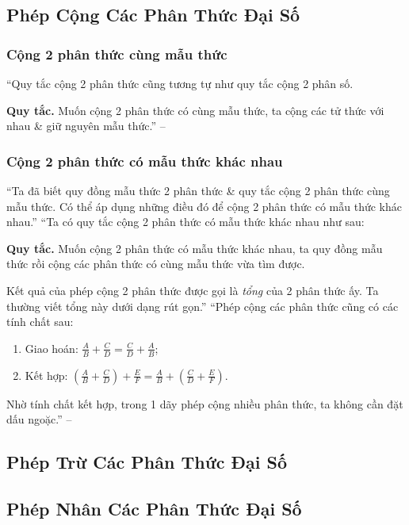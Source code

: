 \documentclass{article}
\numberwithin{equation}{section}
\begin{document}
\subsection{Phép Cộng Các Phân Thức Đại Số}

\subsubsection{Cộng 2 phân thức cùng mẫu thức}
``Quy tắc cộng 2 phân thức cũng tương tự như quy tắc cộng 2 phân số.

\textbf{Quy tắc.} Muốn cộng 2 phân thức có cùng mẫu thức, ta cộng các tử thức với nhau \& giữ nguyên mẫu thức.'' -- \cite[p. 44]{SGK_Toan_8_tap_1}

\subsubsection{Cộng 2 phân thức có mẫu thức khác nhau}
``Ta đã biết quy đồng mẫu thức 2 phân thức \& quy tắc cộng 2 phân thức cùng mẫu thức. Có thể áp dụng những điều đó để cộng 2 phân thức có mẫu thức khác nhau.'' ``Ta có quy tắc cộng 2 phân thức có mẫu thức khác nhau như sau:

\textbf{Quy tắc.} Muốn cộng 2 phân thức có mẫu thức khác nhau, ta quy đồng mẫu thức rồi cộng các phân thức có cùng mẫu thức vừa tìm được.

Kết quả của phép cộng 2 phân thức được gọi là \textit{tổng} của 2 phân thức ấy. Ta thường viết tổng này dưới dạng rút gọn.'' ``Phép cộng các phân thức cũng có các tính chất sau:
\begin{enumerate}
	\item Giao hoán: $\frac{A}{B} + \frac{C}{D} = \frac{C}{D} + \frac{A}{B}$;
	\item Kết hợp: $\left(\frac{A}{B} + \frac{C}{D}\right) + \frac{E}{F} = \frac{A}{B} + \left(\frac{C}{D} + \frac{E}{F}\right)$.
\end{enumerate}
Nhờ tính chất kết hợp, trong 1 dãy phép cộng nhiều phân thức, ta không cần đặt dấu ngoặc.'' -- \cite[p. 45]{SGK_Toan_8_tap_1}

\subsection{Phép Trừ Các Phân Thức Đại Số}

\subsection{Phép Nhân Các Phân Thức Đại Số}
\end{document}
